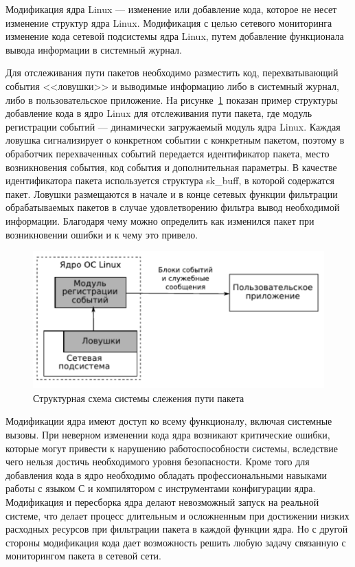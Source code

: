 Модификация ядра Linux --- изменение или добавление кода, которое не несет изменение структур ядра Linux. Модификация с целью сетевого мониторинга изменение кода сетевой подсистемы ядра Linux, путем добавление функционала вывода информации в системный журнал.~\cite{linux_network_implementation}

Для отслеживания пути пакетов необходимо разместить код, перехватывающий события <<ловушки>> и выводимые информацию либо в системный журнал, либо в пользовательское приложение. 
На рисунке~\ref{img:ex_mod} показан пример структуры добавление кода в ядро Linux для отслеживания пути пакета, где модуль регистрации событий --- динамически загружаемый модуль ядра Linux.
Каждая ловушка сигнализирует о конкретном событии с конкретным пакетом, поэтому в обработчик перехваченных событий передается идентификатор пакета, место возникновения события, код события и дополнительная параметры. В качестве идентификатора пакета используется структура sk\_buff, в которой содержатся пакет. Ловушки размещаются в начале и в конце сетевых функции фильтрации обрабатываемых пакетов в случае удовлетворению фильтра вывод необходимой информации. Благодаря чему можно определить как изменился пакет при возникновении ошибки и к чему это привело.~\cite{ip_monitoring}

\begin{figure}[h!]
	\centering
	\includegraphics[height=0.3\textheight]{img/ex_mod} %
	\caption{Структурная схема системы слежения пути пакета}
	\label{img:ex_mod}
\end{figure}

Модификации ядра имеют доступ ко всему функционалу, включая системные вызовы.
При неверном изменении кода ядра возникают критические ошибки, которые могут привести к нарушению работоспособности системы, вследствие чего нельзя достичь необходимого уровня безопасности.
Кроме того для добавления кода в ядро необходимо обладать профессиональными навыками работы с языком С и компилятором с инструментами конфигурации ядра.
Модификация и пересборка ядра делают невозможный запуск на реальной системе, что делает процесс длительным и осложненным при достижении низких расходных ресурсов при фильтрации пакета в каждой функции ядра.
Но с другой стороны модификация кода дает возможность решить любую задачу связанную с мониторингом пакета в сетевой сети. 

